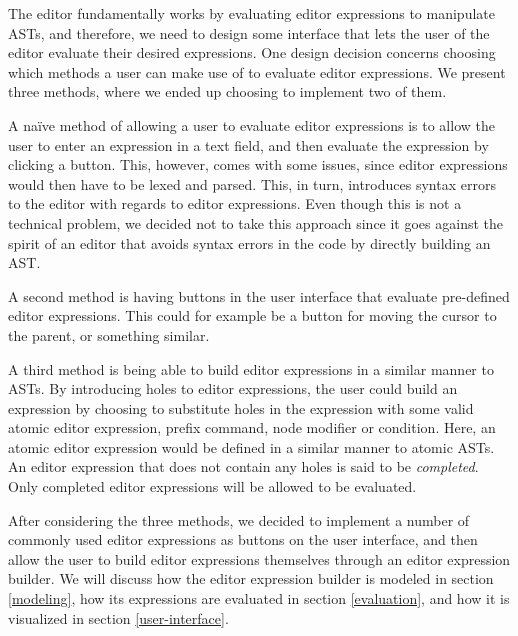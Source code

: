 The editor fundamentally works by evaluating editor expressions to manipulate
ASTs, and therefore, we need to design some interface that lets the user of the
editor evaluate their desired expressions. One design decision concerns
choosing which methods a user can make use of to evaluate editor expressions.
We present three methods, where we ended up choosing to implement two of them.

A na\"ive method of allowing a user to evaluate editor expressions is to allow
the user to enter an expression in a text field, and then evaluate the
expression by clicking a button. This, however, comes with some issues, since
editor expressions would then have to be lexed and parsed. This, in turn,
introduces syntax errors to the editor with regards to editor expressions. Even
though this is not a technical problem, we decided not to take this approach
since it goes against the spirit of an editor that avoids syntax errors in the
code by directly building an AST.

A second method is having buttons in the user interface that evaluate
pre-defined editor expressions. This could for example be a button for moving
the cursor to the parent, or something similar.

A third method is being able to build editor expressions in a similar manner to
ASTs. By introducing holes to editor expressions, the user could build an
expression by choosing to substitute holes in the expression with some valid
atomic editor expression, prefix command, node modifier or condition. Here, an
atomic editor expression would be defined in a similar manner to atomic ASTs. An
editor expression that does not contain any holes is said to be
\textit{completed}. Only completed editor expressions will be allowed to be
evaluated.

After considering the three methods, we decided to implement a number of
commonly used editor expressions as buttons on the user interface, and then
allow the user to build editor expressions themselves through an editor
expression builder. We will discuss how the editor expression builder is modeled
in section \ref{modeling}, how its expressions are evaluated in section
\ref{evaluation}, and how it is visualized in section \ref{user-interface}.
